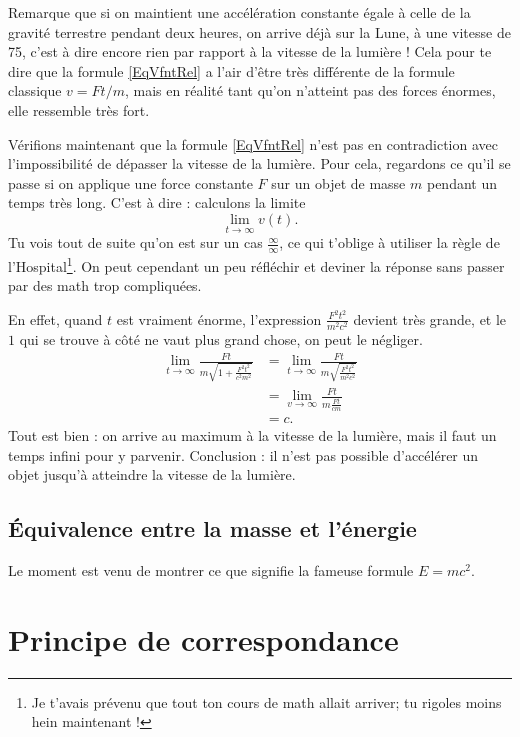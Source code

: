 \documentclass[a4paper,12pt]{book}
\theoremstyle{mes_exemples}	\newtheorem{exemple}[numtho]{Exemple}
\theoremstyle{mes_tho}
\begin{document}
Remarque que si on maintient une accélération constante égale à celle de la gravité terrestre pendant deux heures, on arrive déjà sur la Lune, à une vitesse de \unit{75}{\kilo\meter\per\second}, c'est à dire encore rien par rapport à la vitesse de la lumière ! Cela pour te dire que la formule \eqref{EqVfntRel} a l'air d'être très différente de la formule classique $v=Ft/m$, mais en réalité tant qu'on n'atteint pas des forces énormes, elle ressemble très fort.

Vérifions maintenant que la formule \eqref{EqVfntRel} n'est pas en contradiction avec l'impossibilité de dépasser la vitesse de la lumière. Pour cela, regardons ce qu'il se passe si on applique une force constante $F$ sur un objet de masse $m$ pendant un temps très long. C'est à dire : calculons la limite
\[ 
  \lim_{t\to\infty}v(t).
\]
Tu vois tout de suite qu'on est sur un cas $\frac{ \infty }{ \infty }$, ce qui t'oblige à utiliser la règle de l'Hospital\footnote{Je t'avais prévenu que tout ton cours de math allait arriver; tu rigoles moins hein maintenant !}. On peut cependant un peu réfléchir et deviner la réponse sans passer par des math trop compliquées.

En effet, quand $t$ est vraiment énorme, l'expression $\frac{ F^2t^2 }{ m^2c^2 }$ devient très grande, et le $1$ qui se trouve à côté ne vaut plus grand chose, on peut le négliger.
\begin{equation}
\begin{split}
\lim_{t\to\infty}\frac{ Ft }{ m\sqrt{1+\frac{ F^2t^2 }{ c^2m^2 }} }&=\lim_{t\to\infty}\frac{ Ft }{ m\sqrt{\frac{ F^2t^2 }{ m^2c^2 }} }\\
		&=\lim_{v\to\infty}\frac{ Ft }{ m\frac{ Ft }{ cm } }\\
		&=c.
\end{split}
\end{equation}
Tout est bien : on arrive au maximum à la vitesse de la lumière, mais il faut un temps infini pour y parvenir. Conclusion : il n'est pas possible d'accélérer un objet jusqu'à atteindre la vitesse de la lumière.

\subsection{Équivalence entre la masse et l'énergie}

Le moment est venu de montrer ce que signifie la fameuse formule $E=mc^2$.

\section{Principe de correspondance}
\end{document}
